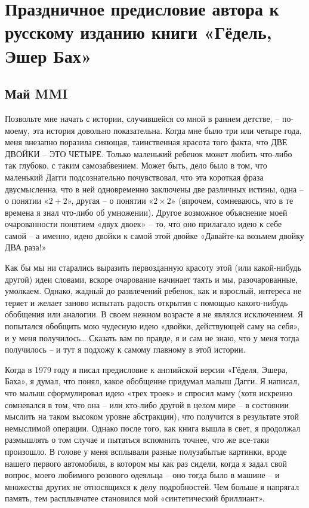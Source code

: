 \documentclass[../main.tex]{subfiles}
\begin{document}
\section[Предисловие]{Праздничное предисловие автора к русскому изданию книги «Гёдель, Эшер Бах»}

\subsection{Май MMI}

Позвольте мне начать с истории, случившейся со мной в раннем детстве, \--- по-моему, эта история довольно показательна. Когда мне было три или четыре года, меня внезапно поразила сияющая, таинственная красота того факта, что ДВЕ ДВОЙКИ \--- ЭТО ЧЕТЫРЕ\@. Только маленький ребенок может любить что-либо так глубоко, с таким самозабвением. Может быть, дело было в том, что маленький Дагги подсознательно почувствовал, что эта короткая фраза двусмысленна, что в ней одновременно заключены две различных истины, одна \--- о понятии «$2 + 2$», другая \--- о понятии «$2 \times 2$» (впрочем, сомневаюсь, что в те времена я знал что-либо об умножении). Другое возможное объяснение моей очарованности понятием «двух двоек» \--- то, что оно прилагало идею к себе самой \--- а именно, идею двойки к самой этой двойке «Давайте-ка возьмем двойку ДВА раза!»

Как бы мы ни старались выразить первозданную красоту этой (или какой-нибудь другой) идеи словами, вскоре очарование начинает таять и мы, разочарованные, умолкаем. Однако, жадный до развлечений ребенок, как и взрослый, интереса не теряет и желает заново испытать радость открытия с помощью какого-нибудь обобщения или аналогии. В своем нежном возрасте я не являлся исключением. Я попытался обобщить мою чудесную идею «двойки, действующей саму на себя», и у меня получилось\ldots{} Сказать вам по правде, я и сам не знаю, что у меня тогда получилось \--- и тут я подхожу к самому главному в этой истории.

Когда в 1979 году я писал предисловие к английской версии «Гёделя, Эшера, Баха», я думал, что понял, какое обобщение придумал малыш Дагги. Я написал, что малыш сформулировал идею «трех троек» и спросил маму (хотя искренно сомневался в том, что она \--- или кто-либо другой в целом мире \--- в состоянии мыслить на таком высоком уровне абстракции), что получится в результате этой немыслимой операции. Однако после того, как книга вышла в свет, я продолжал размышлять о том случае и пытаться вспомнить точнее, что же все-таки произошло. В голове у меня всплывали разные полузабытые картинки, вроде нашего первого автомобиля, в котором мы как раз сидели, когда я задал свой вопрос, моего любимого розового одеяльца \--- оно тогда было в машине \--- и множества других не относящихся к делу подробностей. Чем больше я напрягал память, тем расплывчатее становился мой «синтетический бриллиант».
\end{document}
